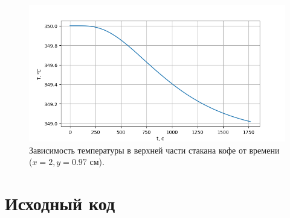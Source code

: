 \begin{figure}[H]
	\center
	\includegraphics[width=.6\linewidth]{imgs_11/temp.png}
	\caption{Зависимость температуры в верхней части стакана кофе от времени ($x=2 , y= 0.97$ см).}
	\label{fig:temp}
\end{figure}

\newpage
\section{Исходный код}



